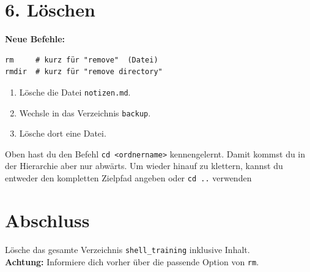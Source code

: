 \documentclass[]{scrreprt}
\begin{document}
\section*{6. Löschen}

\textbf{Neue Befehle:}
\begin{lstlisting}
rm     # kurz für "remove"  (Datei)
rmdir  # kurz für "remove directory"
\end{lstlisting}

\begin{enumerate}
  \item Lösche die Datei \texttt{notizen.md}.
  \item Wechsle in das Verzeichnis \texttt{backup}.
  \item Lösche dort eine Datei.
\end{enumerate}

\begin{tcolorbox}[title=Hinweis]
Oben hast du den Befehl \texttt{cd <ordnername>} kennengelernt. Damit kommst du in der Hierarchie aber nur abwärts. Um wieder hinauf zu klettern, kannst du entweder den kompletten Zielpfad angeben oder \texttt{cd ..} verwenden
\end{tcolorbox}



\section*{Abschluss}

Lösche das gesamte Verzeichnis \texttt{shell\_training} inklusive Inhalt.\\
\textbf{Achtung:} Informiere dich vorher über die passende Option von \texttt{rm}.
\end{document}
